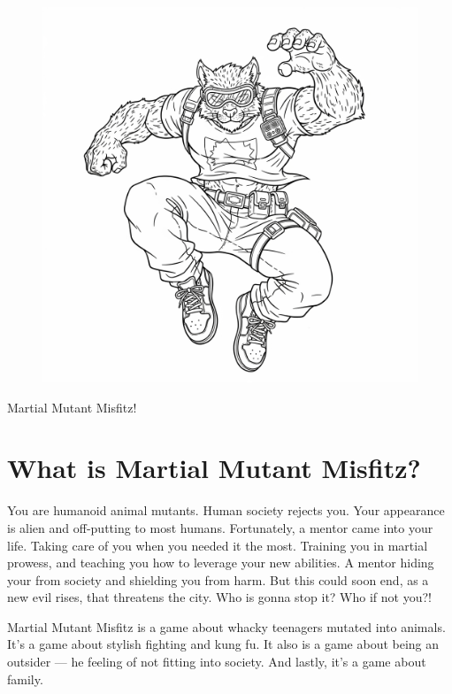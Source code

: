 \documentclass{article}
\begin{document}

\vspace*{\fill}

\begin{figure}[tph!]
\centering\includegraphics[width=12cm]{images/frontCover.png}
\end{figure}
\centering\Huge{}Martial Mutant Misfitz!

\newpage
{}

\section*{What is Martial Mutant Misfitz?}
\raggedright\normalfont\large You are humanoid animal mutants. Human society rejects you. Your appearance is alien and off-putting to most humans. Fortunately, a mentor came into your life. Taking care of you when you needed it the most. Training you in martial prowess, and teaching you how to leverage your new abilities. A mentor hiding your from society and shielding you from harm. But this could soon end, as a new evil rises, that threatens the city. Who is gonna stop it? Who if not you?!

Martial Mutant Misfitz is a game about whacky teenagers mutated into animals. It's a game about stylish fighting and kung fu. It also is a game about being an outsider --- he feeling of not fitting into society. And lastly, it's a game about family.
\newpage
{}
\end{document}
